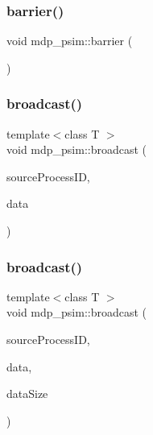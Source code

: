 \mbox{\label{classmdp__psim_a3eb8abda43cf50aacc0c18fdecff8d9d}} 
\subsubsection{\texorpdfstring{barrier()}{barrier()}}
{\footnotesize\ttfamily void mdp\+\_\+psim\+::barrier (\begin{DoxyParamCaption}{ }\end{DoxyParamCaption})\hspace{0.3cm}{\ttfamily [inline]}}

\mbox{\label{classmdp__psim_a05624a40c296b5da7b4c2841f5f78ac4}} 
\subsubsection{\texorpdfstring{broadcast()}{broadcast()}\hspace{0.1cm}{\footnotesize\ttfamily [1/2]}}
{\footnotesize\ttfamily template$<$class T $>$ \\
void mdp\+\_\+psim\+::broadcast (\begin{DoxyParamCaption}\item[{int}]{source\+Process\+ID,  }\item[{T \&}]{data }\end{DoxyParamCaption})\hspace{0.3cm}{\ttfamily [inline]}}

\mbox{\label{classmdp__psim_a56a3070c3cc566b993357560e491b017}} 
\subsubsection{\texorpdfstring{broadcast()}{broadcast()}\hspace{0.1cm}{\footnotesize\ttfamily [2/2]}}
{\footnotesize\ttfamily template$<$class T $>$ \\
void mdp\+\_\+psim\+::broadcast (\begin{DoxyParamCaption}\item[{int}]{source\+Process\+ID,  }\item[{T $\ast$}]{data,  }\item[{int}]{data\+Size }\end{DoxyParamCaption})\hspace{0.3cm}{\ttfamily [inline]}}

